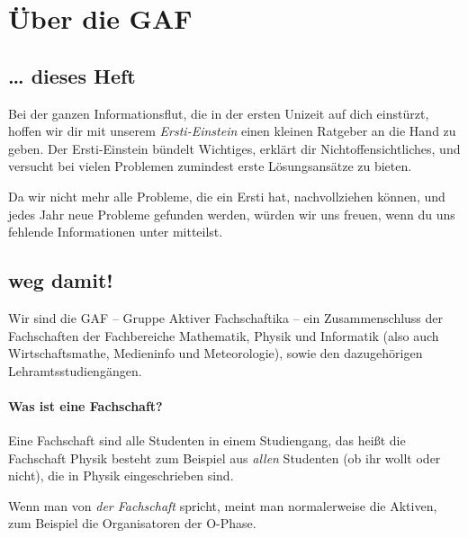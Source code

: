 ﻿\section{Über die GAF}

\subsection{\ldots{} dieses Heft}

Bei der ganzen Informationsflut, die in der ersten Unizeit auf dich
einstürzt, hoffen wir dir mit unserem \emph{Ersti-Einstein} einen
kleinen Ratgeber an die Hand zu geben.  Der Ersti-Einstein bündelt
Wichtiges, erklärt dir Nichtoffensichtliches, und versucht bei vielen
Problemen zumindest erste Lösungsansätze zu bieten.

Da wir nicht mehr alle Probleme, die ein Ersti hat, nachvollziehen
können, und jedes Jahr neue Probleme gefunden werden, würden wir uns
freuen, wenn du uns fehlende Informationen unter
 mitteilst.


\subsection{weg damit!}

Wir sind die GAF -- Gruppe Aktiver Fachschaftika -- ein
Zusammenschluss der Fachschaften der Fachbereiche
Mathematik,
Physik
und Informatik (also auch Wirtschaftsmathe, Medieninfo und
Meteorologie), sowie den dazugehörigen Lehramtsstudiengängen.

\paragraph{Was ist eine Fachschaft?}

Eine Fachschaft sind alle Studenten in einem Studiengang, das heißt die Fachschaft Physik besteht zum Beispiel aus \emph{allen} Studenten (ob ihr wollt oder nicht), die in Physik eingeschrieben sind.

Wenn man von \emph{der Fachschaft} spricht, meint man normalerweise die Aktiven,
zum Beispiel die Organisatoren der O-Phase.

